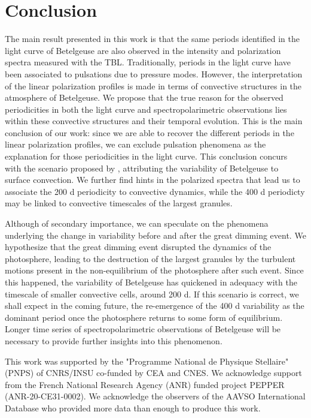 \documentclass{aa}
\begin{document}
\section{Conclusion}
\label{Conclusion}

The main result presented in this work is that the same periods identified in the light curve of Betelgeuse are also observed in the intensity and polarization
spectra measured with the TBL. Traditionally, periods in the light curve have been associated to pulsations due to pressure modes. However, the interpretation of the linear polarization profiles is made in terms of convective structures in the atmosphere of Betelgeuse. We propose that the true reason for the observed periodicities in both the light curve and spectropolarimetric observations lies within these convective structures and their temporal evolution. This is the main conclusion of our work: since we are able to recover the different periods in the linear polarization profiles, we can exclude pulsation phenomena as the explanation for those periodicities in the
light curve. This conclusion concurs with the scenario proposed by \cite{gray_mass_2008}, attributing the variability of Betelgeuse to surface convection. We further find hints in the polarized spectra that lead us to associate the 200 d periodicity to convective dynamics, while the 400 d periodicty may be linked to convective timescales of the largest granules. 


Although of secondary importance, we can speculate on the phenomena underlying the change in variability before and after the great dimming event. We hypothesize that the great dimming event disrupted the dynamics of the photosphere, leading to the destruction of the largest granules by the turbulent motions present in the non-equilibrium of the photosphere after such event. Since this happened, the variability of Betelgeuse has quickened in adequacy with the timescale of smaller convective cells, around 200 d. If this scenario is correct, we shall expect in the coming future, the re-emergence of the 400 d variability as the dominant period once the photosphere returns to some form of equilibrium. Longer time 
series of spectropolarimetric observations of Betelgeuse will be necessary to provide further insights into this phenomenon.



\begin{acknowledgements}
    This work was supported by the "Programme National de Physique Stellaire" (PNPS) of CNRS/INSU co-funded by CEA and CNES.
    We acknowledge support from the French National Research Agency (ANR)
    funded project PEPPER (ANR-20-CE31-0002).
    We acknowledge the observers of the AAVSO International Database who provided more data than enough to produce this work.
    
    \end{acknowledgements}
    
    
    
    
\end{document}
